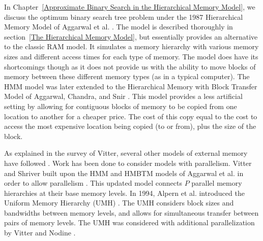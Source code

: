 \documentclass[letterpaper,12pt,titlepage,oneside,final]{book}
\theoremstyle{plain}
\begin{document}
In Chapter~\ref{Approximate Binary Search in the Hierarchical Memory Model}, we discuss the optimum binary search tree problem under the 1987 Hierarchical Memory Model of Aggarwal et al. \cite{aggarwal1987model}. The model is described thoroughly in section~\ref{The Hierarchical Memory Model}, but essentially provides an alternative to the classic RAM model. It simulates a memory hierarchy with various memory sizes and different access times for each type of memory. The model does have its shortcomings though as it does not provide us with the ability to move blocks of memory between these different memory types (as in a typical computer). The HMM model was later extended to the Hierarchical Memory with Block Transfer Model of Aggarwal, Chandra, and Snir \cite{aggarwal1987hierarchical}. This model provides a less artificial setting by allowing for contiguous blocks of memory to be copied from one location to another for a cheaper price. The cost of this copy equal to the cost to access the most expensive location being copied (to or from), plus the size of the block.

\iffalse
In Chapter~\ref{Approximate Binary Search in the Hierarchical Memory with Block Transfer Model} we examine the same optimum binary search tree problem but under the extended Hierarchical Memory with Block Transfer Model of Aggarwal, Chandra, and Snir \cite{aggarwal1987hierarchical}. This model extends the previous model, proving a slightly less artificial setting by allowing for contiguous blocks of memory to be copied from one location to another for a cheaper price. The cost of this copy equal to the cost to access the most expensive location being copied, (to or from) plus the size of the block. \\

\fi

As explained in the survey of Vitter, several other models of external memory have followed \cite{vitter2001external}. Work has been done to consider models with parallelism. Vitter and Shriver built upon the HMM and HMBTM models of Aggarwal et al. \cite{aggarwal1987model, aggarwal1987hierarchical} in order to allow parallelism \cite{vitter1994algorithms}. This updated model connects $P$ parallel memory hierarchies at their base memory levels. In 1994, Alpern et al. introduced the Uniform Memory Hierarchy (UMH) \cite{alpern1994uniform}. The UMH considers block sizes and bandwidths between memory levels, and allows for simultaneous transfer between pairs of memory levels. The UMH was considered with additional parallelization by Vitter and Nodine \cite{vitter1993large}.
\end{document}
